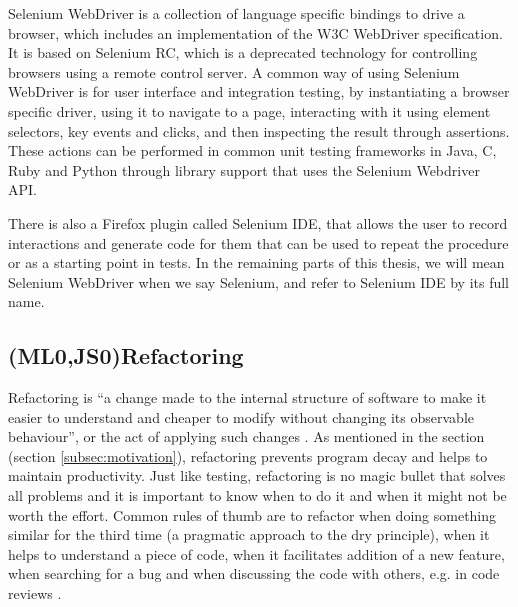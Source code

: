 \documentclass[11pt]{article}
\begin{document}
Selenium WebDriver is a collection of language specific bindings to drive a browser, which includes an implementation of the W3C WebDriver specification. It is based on Selenium RC, which is a deprecated technology for controlling browsers using a remote control server. A common way of using Selenium WebDriver is for user interface and integration testing, by instantiating a browser specific driver, using it to navigate to a page, interacting with it using element selectors, key events and clicks, and then inspecting the result through assertions. These actions can be performed in common unit testing frameworks in Java, C\nolinebreak\hspace{-.05em}\raisebox{.3ex}{\scriptsize\bf \#}, Ruby and Python through library support that uses the Selenium Webdriver API. \cite{Selenium}

There is also a Firefox plugin called Selenium IDE, that allows the user to record interactions and generate code for them that can be used to repeat the procedure or as a starting point in tests. In the remaining parts of this thesis, we will mean Selenium WebDriver when we say Selenium, and refer to Selenium IDE by its full name.

\subsection{(ML0,JS0)Refactoring}
\label{subsec:refactor}

Refactoring is ``a change made to the internal structure of software to make it easier to understand and cheaper to modify without changing its observable behaviour'', or the act of applying such changes \cite[p.~46]{Refactoring}. As mentioned in the  section (section \ref{subsec:motivation}), refactoring prevents program decay and helps to maintain productivity. Just like testing, refactoring is no magic bullet that solves all problems and it is important to know when to do it and when it might not be worth the effort. Common rules of thumb are to refactor when doing something similar for the third time (a pragmatic approach to the \gls{dry} principle), when it helps to understand a piece of code, when it facilitates addition of a new feature, when searching for a bug and when discussing the code with others, e.g. in code reviews \cite[p.~49-51]{Refactoring}.
\end{document}
